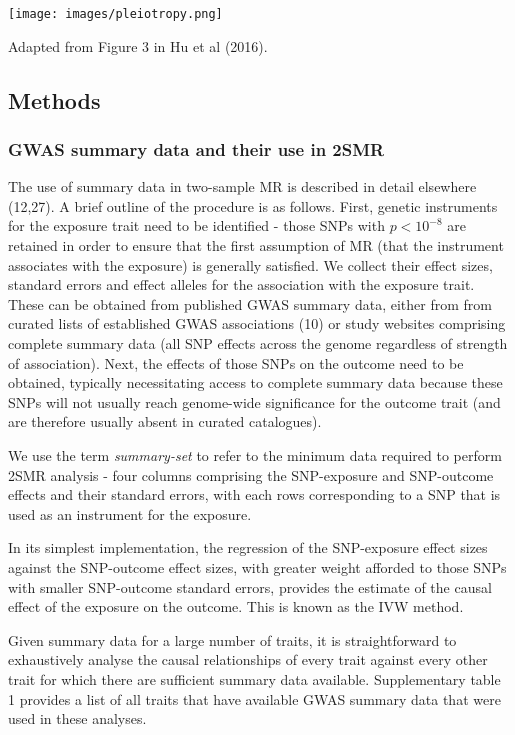 \documentclass[]{article}
\begin{document}
\texttt{[image: images/pleiotropy.png]}

Adapted from Figure 3 in Hu et al (2016).

\subsection{Methods}\label{methods}

\subsubsection{GWAS summary data and their use in
2SMR}\label{gwas-summary-data-and-their-use-in-2smr}

The use of summary data in two-sample MR is described in detail
elsewhere (12,27). A brief outline of the procedure is as follows.
First, genetic instruments for the exposure trait need to be identified
- those SNPs with \(p < 10^{-8}\) are retained in order to ensure that
the first assumption of MR (that the instrument associates with the
exposure) is generally satisfied. We collect their effect sizes,
standard errors and effect alleles for the association with the exposure
trait. These can be obtained from published GWAS summary data, either
from from curated lists of established GWAS associations (10) or study
websites comprising complete summary data (all SNP effects across the
genome regardless of strength of association). Next, the effects of
those SNPs on the outcome need to be obtained, typically necessitating
access to complete summary data because these SNPs will not usually
reach genome-wide significance for the outcome trait (and are therefore
usually absent in curated catalogues).

We use the term \emph{summary-set} to refer to the minimum data required
to perform 2SMR analysis - four columns comprising the SNP-exposure and
SNP-outcome effects and their standard errors, with each rows
corresponding to a SNP that is used as an instrument for the exposure.

In its simplest implementation, the regression of the SNP-exposure
effect sizes against the SNP-outcome effect sizes, with greater weight
afforded to those SNPs with smaller SNP-outcome standard errors,
provides the estimate of the causal effect of the exposure on the
outcome. This is known as the IVW method.

Given summary data for a large number of traits, it is straightforward
to exhaustively analyse the causal relationships of every trait against
every other trait for which there are sufficient summary data available.
Supplementary table 1 provides a list of all traits that have available
GWAS summary data that were used in these analyses.
\end{document}
